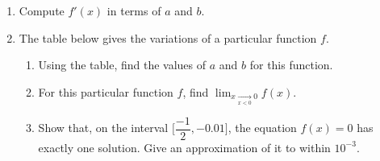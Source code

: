 	\begin{enumerate}
	\item Compute $f'(x)$ in terms of $a$ and $b$.
	\item The table below gives the variations of a particular function $f$.

	\medskip
	\begin{center}
	\end{center}

	\medskip
	\begin{enumerate}
	\item Using the table, find the values of $a$ and $b$ for
	 this function.
	\item For this particular function $f$, find
	        $\displaystyle \lim_{x \xrightarrow[x<0]{} 0} f(x)$.
	\item Show that, on the interval $\Big[\dfrac{-1}{2}, -0.01\Big]$, the equation $f(x)=0$
	 has exactly one solution. Give an approximation of it to within $10^{-3}$.
	\end{enumerate}
	\end{enumerate}

